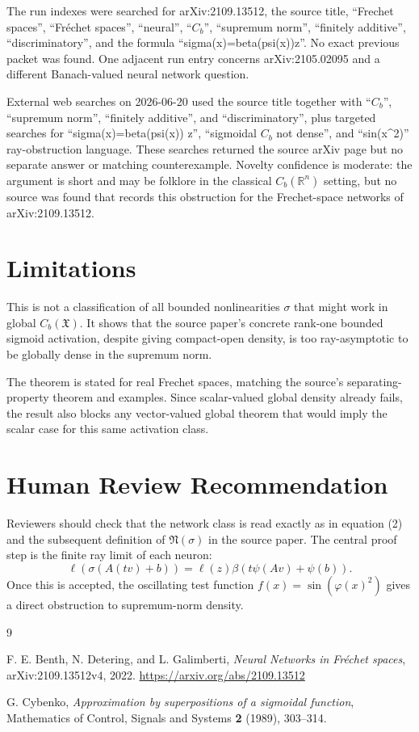 \documentclass[11pt]{article}
\newcommand{\X}{\mathfrak X}
\newcommand{\N}{\mathfrak N}
\newcommand{\R}{\mathbb R}
\newcommand{\Cb}{C_b}
\begin{document}
The run indexes were searched for arXiv:2109.13512, the source title,
``Frechet spaces'', ``Fr\'echet spaces'', ``neural'', ``\(C_b\)'',
``supremum norm'', ``finitely additive'', ``discriminatory'', and the formula
``sigma(x)=beta(psi(x))z''. No exact previous packet was found. One adjacent
run entry concerns arXiv:2105.02095 and a different Banach-valued neural
network question.

External web searches on 2026-06-20 used the source title together with
``\(C_b\)'', ``supremum norm'', ``finitely additive'', and ``discriminatory'',
plus targeted searches for ``sigma(x)=beta(psi(x)) z'', ``sigmoidal \(C_b\)
not dense'', and ``sin(x\^{}2)'' ray-obstruction language. These searches
returned the source arXiv page but no separate answer or matching
counterexample. Novelty confidence is moderate: the argument is short and may
be folklore in the classical \(C_b(\R^n)\) setting, but no source was found
that records this obstruction for the Frechet-space networks of arXiv:2109.13512.

\section*{Limitations}

This is not a classification of all bounded nonlinearities \(\sigma\) that
might work in global \(\Cb(\X)\). It shows that the source paper's concrete
rank-one bounded sigmoid activation, despite giving compact-open density, is
too ray-asymptotic to be globally dense in the supremum norm.

The theorem is stated for real Frechet spaces, matching the source's
separating-property theorem and examples. Since scalar-valued global density
already fails, the result also blocks any vector-valued global theorem that
would imply the scalar case for this same activation class.

\section*{Human Review Recommendation}

Reviewers should check that the network class is read exactly as in equation
(2) and the subsequent definition of \(\N(\sigma)\) in the source paper. The
central proof step is the finite ray limit of each neuron:
\[
  \ell(\sigma(A(tv)+b))
  =\ell(z)\beta(t\psi(Av)+\psi(b)).
\]
Once this is accepted, the oscillating test function \(f(x)=\sin(\varphi(x)^2)\)
gives a direct obstruction to supremum-norm density.

\begin{thebibliography}{9}

F. E. Benth, N. Detering, and L. Galimberti,
\emph{Neural Networks in Fr\'echet spaces},
arXiv:2109.13512v4, 2022.
\url{https://arxiv.org/abs/2109.13512}

G. Cybenko,
\emph{Approximation by superpositions of a sigmoidal function},
Mathematics of Control, Signals and Systems \textbf{2} (1989), 303--314.

\end{thebibliography}
\end{document}
